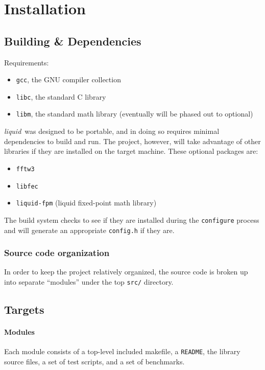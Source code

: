 \documentclass[11pt,twoside]{report}
\newcommand{\liquid}{{\it liquid}}
\begin{document}
%
%
\chapter{Installation}
\label{ch:installation}

\section{Building \& Dependencies}
\label{ch:installation:building}
Requirements:
\begin{itemize}
\item {\tt gcc}, the GNU compiler collection
\item {\tt libc}, the standard C library
\item {\tt libm}, the standard math library (eventually will be phased out to
optional)
\end{itemize}

\liquid\ was designed to be portable, and in doing so requires minimal dependencies to
build and run.
The project, however, will take advantage of other libraries if they are installed on the
target machine.
These optional packages are:
\begin{itemize}
\item {\tt fftw3}
\item {\tt libfec}
\item {\tt liquid-fpm} (liquid fixed-point math library)
\end{itemize}
The build system checks to see if they are installed during the {\tt configure} process
and will generate an appropriate {\tt config.h} if they are.

\subsection{Source code organization}
In order to keep the project relatively organized, the source code is broken
up into separate ``modules'' under the top {\tt src/} directory.

\section{Targets}
\label{ch:installation:targets}

\subsubsection{Modules}
Each module consists of a top-level included makefile, a {\tt README}, the
library source files, a set of test scripts, and a set of benchmarks.
\end{document}
